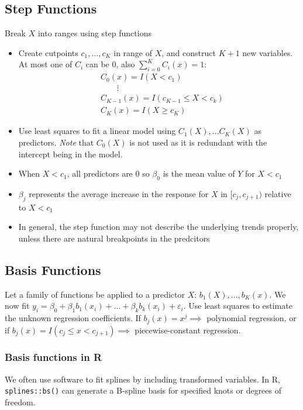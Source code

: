 \documentclass[11pt]{article}
\begin{document}
\subsection{Step Functions}
\noindent Break $X$ into ranges using step functions
\begin{itemize}
    \item Create cutpoints $c_1,...,c_K$ in range of $X$, and construct $K+1$ new variables. At most one of $C_i$ can be $0$, also $\sum_{i=0}^{K}C_i(x) = 1$:
        \begin{align*}
            &C_0(x) = I(X < c_1) \\
            & \quad \quad \vdots \\
            &C_{K-1}(x) = I(c_{K-1} \leq X < c_k) \\
            &C_K(x) = I(X \geq c_K)
        \end{align*}
    \item Use least squares to fit a linear model using $C_1(X),...C_K(X)$ as predictors. \textit{Note} that $C_0(X)$ is not used as it is redundant with the intercept being in the model.
    \item When $X < c_1$, all predictors are $0$ so $\beta_0$ is the mean value of $Y$ for $X < c_1$
    \item $\beta_j$ represents the average increase in the response for $X$ in $[c_j, c_{j+1})$ relative to $X < c_1$
    \item In general, the step function may not describe the underlying trends properly, unless there are natural breakpoints in the predcitors
\end{itemize}

\subsection{Basis Functions}
\noindent Let a family of functions be applied to a predictor $X$: $b_1(X),...,b_K(x)$. We now fit $y_i = \beta_0 + \beta_1b_1(x_i)+...+\beta_kb_k(x_i) + \varepsilon_i$. Use least squares to estimate the unknown regression coefficients. If $b_j(x) = x^j \implies$ polynomial regression, or if $b_j(x) = I(c_j \leq x < c_{j+1}) \implies $ piecewise-constant regression.

\subsubsection{Basis functions in R}
\noindent We often use software to fit splines by including transformed variables. In R, \texttt{splines::bs()} can generate a B-spline basis for specified knots or degrees of freedom. \\
\end{document}
